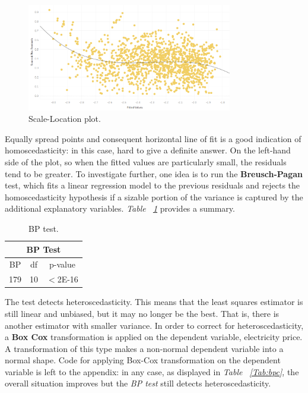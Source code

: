 \documentclass[a4paper,12pt]{book}
\begin{document}
\begin{figure}[tb]
\begin{center}
\captionsetup{justification=centering}
\includegraphics[width=0.8\textwidth]{Images/scalelog.png}
\caption{Scale-Location plot.}
\label{fig:slp}
\end{center}
\end{figure}

Equally spread points and consequent horizontal line of fit is a good indication of homoscedasticity: in this case, hard to give a definite answer. On the left-hand side of the plot, so when the fitted values are particularly small, the residuals tend to be greater. To investigate further, one idea is to run the \textbf{Breusch-Pagan} test, which fits a linear regression model to the previous residuals and rejects the homoscedasticity hypothesis if a sizable portion of the variance is captured by the additional explanatory variables. \textit{Table ~\ref{Tab:bpt}} provides a summary.

\begin{table}[tb]
\begin{center}
\begin{tabular}{|c|c|c|}
\hline
\multicolumn{3}{|c|}{BP Test}\\
\hline
BP&df&p-value\\
179&10&$<$2E-16\\
\hline
\end{tabular}
\caption{BP test.}
\label{Tab:bpt}
\end{center}
\end{table}

The test detects heteroscedasticity. This means that the least squares estimator is still linear and unbiased, but it may no longer be the best. That is, there is another estimator with smaller variance. In order to correct for heteroscedasticity, a \textbf{Box Cox} transformation is applied on the dependent variable, electricity price. A transformation of this type makes a non-normal dependent variable into a normal shape. \cite{box1964analysis} Code for applying Box-Cox transformation on the dependent variable is left to the appendix: in any case, as displayed in \textit{Table ~\ref{Tab:bpc}}, the overall situation improves but the \textit{BP test} still detects heteroscedasticity.
\end{document}
